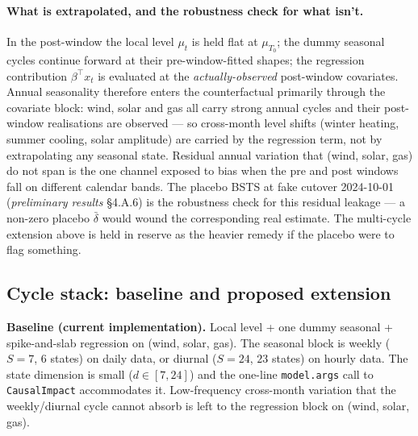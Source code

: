 \documentclass[11pt,a4paper]{article}
\begin{document}
\paragraph{What is extrapolated, and the robustness check for what isn't.} In the post-window the local level $\mu_t$ is held flat at $\mu_{T_0}$; the dummy seasonal cycles continue forward at their pre-window-fitted shapes; the regression contribution $\beta^{\!\top} x_t$ is evaluated at the \emph{actually-observed} post-window covariates. Annual seasonality therefore enters the counterfactual primarily through the covariate block: wind, solar and gas all carry strong annual cycles and their post-window realisations are observed --- so cross-month level shifts (winter heating, summer cooling, solar amplitude) are carried by the regression term, not by extrapolating any seasonal state. Residual annual variation that (wind, solar, gas) do not span is the one channel exposed to bias when the pre and post windows fall on different calendar bands. The placebo BSTS at fake cutover 2024-10-01 (\emph{preliminary results} \S 4.A.6) is the robustness check for this residual leakage --- a non-zero placebo $\bar\delta$ would wound the corresponding real estimate. The multi-cycle extension above is held in reserve as the heavier remedy if the placebo were to flag something.

\subsection*{Cycle stack: baseline and proposed extension}

\noindent\textbf{Baseline (current implementation).} Local level + one dummy seasonal + spike-and-slab regression on (wind, solar, gas). The seasonal block is weekly ($S = 7$, $6$ states) on daily data, or diurnal ($S = 24$, $23$ states) on hourly data. The state dimension is small ($d \in [7, 24]$) and the one-line \texttt{model.args} call to \texttt{CausalImpact} accommodates it. Low-frequency cross-month variation that the weekly/diurnal cycle cannot absorb is left to the regression block on (wind, solar, gas).
\end{document}
